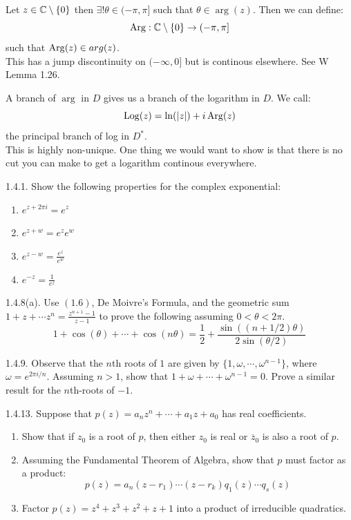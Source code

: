 \documentclass[12pt]{amsart}
\begin{document}
\begin{example}
    Let $z \in \mathbb C \setminus \{0\}$ then $\exists! \theta \in (-\pi, \pi]$ such that $\theta \in \arg(z)$. Then we can define: 
    \[ \operatorname{Arg}: \mathbb C \setminus \{0\}  \to (-\pi, \pi]\]
    such that $\operatorname{Arg}(z) \in arg(z)$. \\
    This has a jump discontinuity on $(-\infty, 0]$ but is continous elsewhere. See W Lemma 1.26.
\end{example}

A branch of $\arg$ in $D$ gives us a branch of the logarithm in $D$. We call: 
\[ \operatorname{Log}(z) = \ln(|z|) + i \operatorname{Arg}(z)\]
the principal branch of log in $D^*$. \\

This is highly non-unique. One thing we would want to show is that there is no cut you can make to get a logarithm continous everywhere. 

\begin{exercise}{1.4.1.}
    Show the following properties for the complex exponential: 
    \begin{enumerate}
        \item $e^{z+2\pi i} = e^z$
        \item $e^{z+w} = e^ze^w$
        \item $e^{z-w} = \frac{e^z}{e^w}$
        \item $e^{-z} = \frac{1}{e^z}$
    \end{enumerate}
\end{exercise}

\begin{exercise}{1.4.8(a).}
    Use $(1.6)$, De Moivre's Formula, and the geometric sum $1+z + \cdots z^n = \frac{z^{n+1}-1}{z-1}$ to prove the following assuming $0 < \theta < 2\pi$. 
    \[ 1 + \cos(\theta) + \cdots + \cos(n\theta) = \frac{1}{2} + \frac{\sin((n+1/2)\theta)}{2\sin(\theta/2)}\]
\end{exercise}

\begin{exercise}{1.4.9.}
    Observe that the $n$th roots of $1$ are given by $\{1, \omega, \cdots, \omega^{n-1}\}$, where $\omega = e^{2\pi i/n}$. Assuming $n > 1$, show that $1+\omega+\cdots+\omega^{n-1} = 0$. Prove a similar result for the $n$th-roots of $-1$. 
\end{exercise}

\begin{exercise}{1.4.13.}
    Suppose that $p(z) = a_nz^n + \cdots + a_1z + a_0$ has real coefficients. 
    \begin{enumerate}
        \item Show that if $z_0$ is a root of $p$, then either $z_0$ is real or $\overline{z}_0$ is also a root of $p$. 
        \item Assuming the Fundamental Theorem of Algebra, show that $p$ must factor as a product: 
        \[ p(z) = a_n(z-r_1)\cdots(z-r_k)q_1(z)\cdots q_s(z)\]
        \item Factor $p(z) = z^4 + z^3 + z^2 + z + 1$ into a product of irreducible quadratics. 
    \end{enumerate}
\end{exercise}
\end{document}
